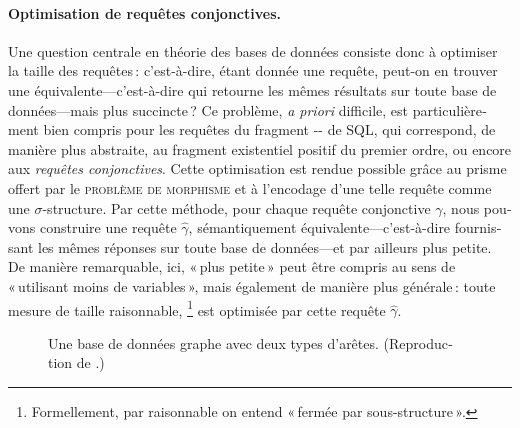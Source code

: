 \begin{french}
\paragraph*{Optimisation de requêtes conjonctives.}
Une question centrale en théorie des bases de données consiste donc à optimiser la taille 
des requêtes : c'est-à-dire, étant donnée une requête, peut-on en trouver une équivalente---c'est-à-dire qui retourne les mêmes résultats sur toute base de données---mais plus succincte ?
Ce problème, \emph{a priori} difficile, est particulièrement bien compris pour les requêtes du
fragment -- de SQL, qui correspond, de manière
plus abstraite, au fragment existentiel positif du premier ordre,
ou encore aux \emph{requêtes conjonctives}.
Cette optimisation est rendue possible grâce au prisme offert par le \textsc{problème de morphisme} et à l'encodage d'une telle requête comme une $\sigma$-structure.
Par cette méthode, pour chaque requête conjonctive $\gamma$, nous pouvons construire une requête $\widehat{\gamma}$, sémantiquement équivalente---c'est-à-dire fournissant les mêmes réponses sur toute base de données---et par ailleurs plus petite.
De manière remarquable, ici, « plus petite » peut être compris
au sens de « utilisant moins de variables », mais également de manière plus générale : toute mesure de taille raisonnable,%
\footnote{Formellement, par raisonnable on entend « fermée par sous-structure ».}
est optimisée par cette requête $\widehat{\gamma}$.

\begin{figure}[h]
    \centering
    \begin{tikzpicture}
        
    \end{tikzpicture}
    \caption{%
        \AP\label{fig:example-graph-database-fr}%
        Une base de données graphe avec deux types d'arêtes.
		(Reproduction de .)
    }
\end{figure}


\end{french}
